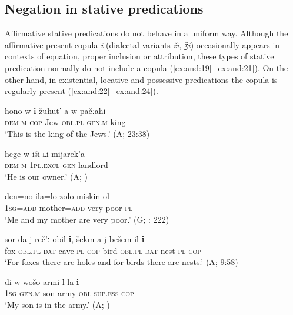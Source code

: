\documentclass[output=paper,colorlinks=true, citecolor=brown]{langscibook}
\begin{document}
\subsection{Negation in stative predications} \label{sec:and:2.3}

Affirmative stative predications do not behave in a uniform way. Although the affirmative present copula \textit{i} (dialectal variants \textit{ži}, \textit{ǯi}) occasionally appears in contexts of equation, proper inclusion or attribution, these types of stative predication normally do not include a copula (\ref{ex:and:19}–\ref{ex:and:21}). On the other hand, in existential, locative and possessive predications the copula is regularly present (\ref{ex:and:22}–\ref{ex:and:24}). 

\ea 
    \label{ex:and:19} 
    \gll hono-w \textbf{i} žuhut’-a-w pačːahi\\
          \textsc{dem-m} \textsc{cop} Jew-\textsc{obl.pl-gen.m} king\\
    \glt ‘This is the king of the Jews.’ (A;  23:38)
\z

\ea
    \label{ex:and:20}
    \gll hege-w iši-ʟi mijarek’a\\
          \textsc{dem-m} \textsc{1pl.excl-gen} landlord\\
     ‘He is our owner.’ (A; ) 
\z 

\ea
    \label{ex:and:21}
    \gll den=no ila=lo zolo miskin{}-ol\\
          \textsc{1sg}=\textsc{add} mother=\textsc{add} very poor{}-\textsc{pl}\\
    \glt ‘Me and my mother are very poor.’ (G; \citealt{Salimov2010}: 222) 
\z

\ea
    \label{ex:and:22}
    \gll sor{}-da{}-j reč’ː{}-obil \textbf{i}, šekm{}-a{}-j bešem{}-il \textbf{i}\\
          fox-\textsc{obl.pl-dat} cave-\textsc{pl} \textsc{cop} bird-\textsc{obl.pl-dat} nest-\textsc{pl} \textsc{cop}\\
    \glt ‘For foxes there are holes and for birds there are nests.’ (A;  9:58)
\z

\ea
    \label{ex:and:23} 
    \gll di-w wošo armi-l-la \textbf{i}\\
         \textsc{1sg}-\textsc{gen.m} son army-\textsc{obl-sup.ess} \textsc{cop}\\
    \glt ‘My son is in the army.’ (A; \citealt[58]{Alisultanova2010})
\z 
\end{document}
